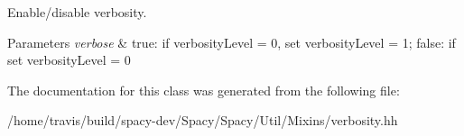 \-Enable/disable verbosity. 


\begin{DoxyParams}{\-Parameters}
{\em verbose} & true\-: if verbosity\-Level = 0, set verbosity\-Level = 1; false\-: if set verbosity\-Level = 0 \\
\hline
\end{DoxyParams}


\-The documentation for this class was generated from the following file\-:\begin{DoxyCompactItemize}
\item 
/home/travis/build/spacy-\/dev/\-Spacy/\-Spacy/\-Util/\-Mixins/verbosity.\-hh\end{DoxyCompactItemize}
